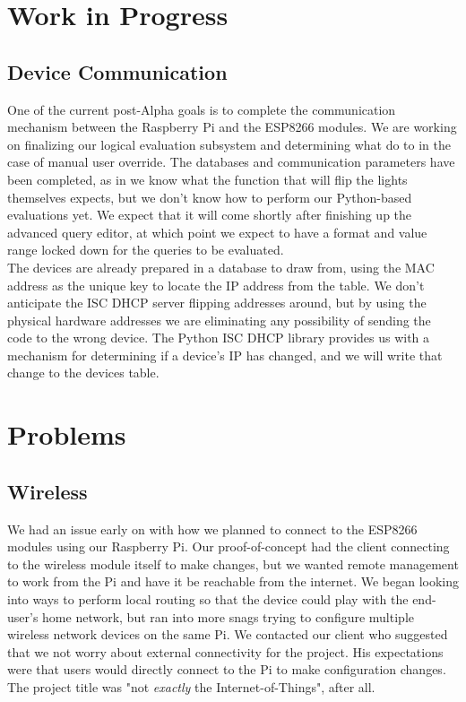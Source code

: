 \documentclass[oneside,openright]{book}
\begin{document}
\section{Work in Progress}
\subsection{Device Communication}
One of the current post-Alpha goals is to complete the communication mechanism between the Raspberry Pi and the ESP8266 modules. We are working on finalizing our logical evaluation subsystem and determining what do to in the case of manual user override. The databases and communication parameters have been completed, as in we know what the function that will flip the lights themselves expects, but we don't know how to perform our Python-based evaluations yet. We expect that it will come shortly after finishing up the advanced query editor, at which point we expect to have a format and value range locked down for the queries to be evaluated.\\

The devices are already prepared in a database to draw from, using the MAC address as the unique key to locate the IP address from the table. We don't anticipate the ISC DHCP server flipping addresses around, but by using the physical hardware addresses we are eliminating any possibility of sending the code to the wrong device. The Python ISC DHCP library provides us with a mechanism for determining if a device's IP has changed, and we will write that change to the devices table.
\section{Problems}
\subsection{Wireless}
We had an issue early on with how we planned to connect to the ESP8266 modules using our Raspberry Pi. Our proof-of-concept had the client connecting to the wireless module itself to make changes, but we wanted remote management to work from the Pi and have it be reachable from the internet. We began looking into ways to perform local routing so that the device could play with the end-user's home network, but ran into more snags trying to configure multiple wireless network devices on the same Pi. We contacted our client who suggested that we not worry about external connectivity for the project. His expectations were that users would directly connect to the Pi to make configuration changes. The project title was "not \textit{exactly} the Internet-of-Things", after all.\\
\end{document}
